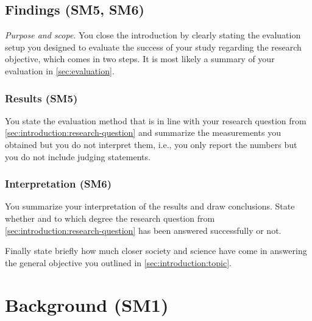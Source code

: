 \documentclass[
  fontsize=10pt
  numbers=noenddot,
  english,  %
  paper=a5,
  twoside,  %
  DIV=calc,
  headings=small,
  bibliography=totoc,
  listof=totoc,
  draft=false
]{scrbook}
\theoremstyle{break}
\begin{document}
\section{Findings (SM5, SM6)}\label{sec:introduction:results}

\emph{Purpose and scope}. You close the introduction by clearly stating the evaluation setup you designed to evaluate the success of your study regarding the research objective, which comes in two steps. It is most likely a summary of your evaluation in \cref{sec:evaluation}.

\subsection*{Results (SM5)}

You state the evaluation method that is in line with your research question from \cref{sec:introduction:research-question} and summarize the measurements you obtained but you do not interpret them, i.e., you only report the numbers but you do not include judging statements.

\subsection*{Interpretation (SM6)}

You summarize your interpretation of the results and draw conclusions. State whether and to which degree the research question from \cref{sec:introduction:research-question} has been answered successfully or not.

Finally state briefly how much closer society and science have come in answering the general objective you outlined in \cref{sec:introduction:topic}.

\chapter{Background (SM1)}\label{sec:background}
\end{document}
